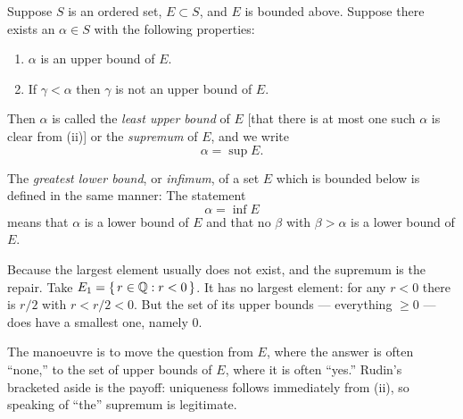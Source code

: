 \documentclass[11pt,twoside]{article}
\begin{document}
Suppose $S$ is an ordered set, $E \subset S$, and $E$ is bounded above. Suppose
there exists an $\alpha \in S$ with the following properties:
\begin{enumerate}[label=(\roman*), leftmargin=2.2em, itemsep=2pt, topsep=4pt]
  \item $\alpha$ is an upper bound of $E$.
  \item If $\gamma < \alpha$ then $\gamma$ is not an upper bound of
        $E$.
\end{enumerate}
Then $\alpha$ is called the \emph{least upper bound} of $E$ [that there is at
most one such $\alpha$ is clear from (ii)] or the \emph{supremum} of $E$, and we
write
\[ \alpha = \sup E. \]

The \emph{greatest lower bound}, or \emph{infimum}, of a set $E$ which is
bounded below is defined in the same manner: The statement
\[ \alpha = \inf E \]
means that $\alpha$ is a lower bound of $E$ and that no $\beta$ with
$\beta > \alpha$ is a lower bound of $E$.

\begin{unpack}
Because the largest element usually does not exist, and the supremum is the
repair. Take $E_1 = \{\, r \in \mathbb{Q} : r < 0 \,\}$. It has no largest element: for
any $r<0$ there is $r/2$ with $r < r/2 < 0$. But the set of its upper bounds ---
everything ${}\ge 0$ --- does have a smallest one, namely $0$.

The manoeuvre is to move the question from $E$, where the answer is often
``none,'' to the set of upper bounds of $E$, where it is often ``yes.'' Rudin's
bracketed aside is the payoff: uniqueness follows immediately from (ii), so
speaking of ``the'' supremum is legitimate.
\end{unpack}
\end{document}
